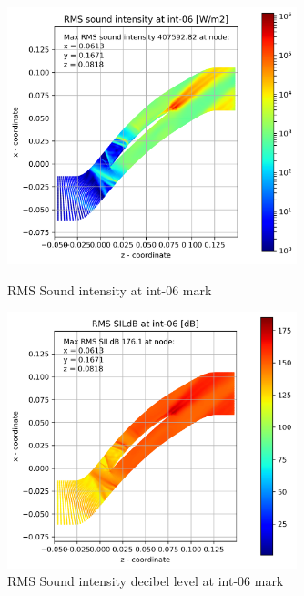 \begin{figure}[ht]
  \centering
  \includegraphics[width=0.75\textwidth]{Figures/int-06-rms-sil.png}
  \caption{RMS Sound intensity at int-06 mark} \label{int-06-rms-sil}
  
  \vspace*{\floatsep}%

  \includegraphics[width=0.75\textwidth]{Figures/int-06-rms-sildb.png}
  \caption{RMS Sound intensity decibel level at int-06 mark} \label{int-06-rms-sildb}
\end{figure}


